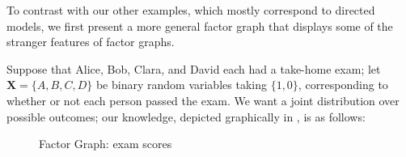 \documentclass{article}
\numberwithin{equation}{section}
\begin{document}

		To contrast with our other examples, which mostly correspond to directed models, we first present a more general factor graph that displays some of the stranger features of factor graphs.

	\begin{example}\label{ex:fg-exam}		
          	  Suppose that Alice, Bob, Clara, and David each had a
                take-home exam; let $\mathbf X = \{A, B, C, D\}$ be
                binary random variables taking $\{1,0\}$,
                corresponding to whether or not each person passed the
                exam.  
%		
		We want a joint distribution over possible outcomes; our knowledge, depicted graphically in , is as follows:	

		\begin{figure}[H]
			\centering
			\caption{Factor Graph: exam scores}
			\label{fig:fg-exam}
		\end{figure}
		

\end{example}
\end{document}
